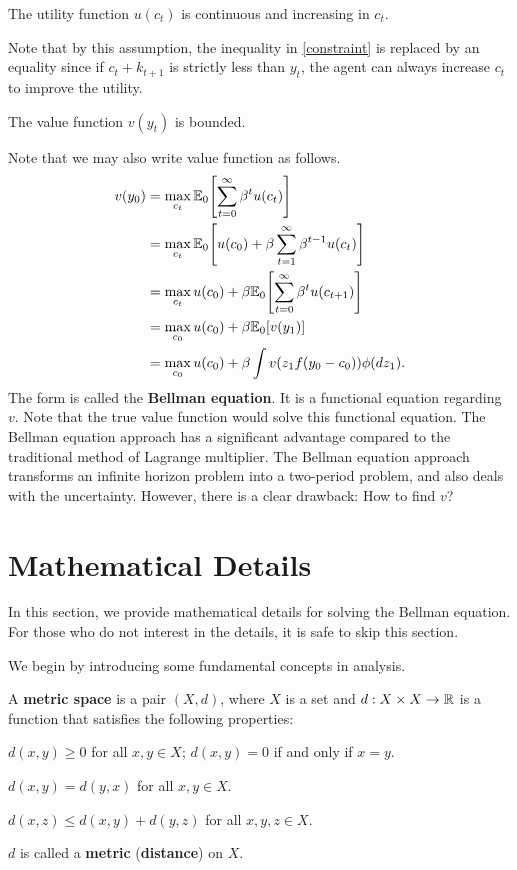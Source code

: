 \documentclass[12pt]{article}
\begin{document}
\begin{assumption}
    The utility function $u(c_t)$ is continuous and increasing in 
    $c_t$.
\end{assumption}

Note that by this assumption, the inequality in \eqref{constraint} 
is replaced by an equality since if $c_t + k_{t+1}$ is strictly less 
than $y_t$, the agent can always increase $c_t$ to improve the 
utility. 

\begin{assumption}
    The value function $v(y_t)$ is bounded.
\end{assumption}

Note that we may also write value function as follows. 
\begin{equation}
    \begin{split}
        v(y_0) 
        &= \max_{c_t} \E_0\sbrc{\sum_{t=0}^{\infty} \beta^t u(c_t)}\\
        &= \max_{c_t} \E_0\sbrc{u(c_0) + \beta\sum_{t=1}^{\infty} \beta^{t-1} u(c_t)}\\
        &= \max_{c_t} u(c_0) + \beta\E_0\sbrc{\sum_{t=0}^{\infty} \beta^{t} u(c_{t+1})}\\ 
        &= \max_{c_0} u(c_0) + \beta\E_0\sbrc{v(y_1)}\\
        &= \max_{c_0} u(c_0) + \beta\int v(z_1f(y_0-c_0))\phi(dz_1).
    \end{split}
\end{equation}
The form is called the \textbf{Bellman equation}. It is a functional 
equation regarding $v$. Note that the true value function would solve 
this functional equation. The Bellman equation approach 
has a significant advantage compared to the traditional method of 
Lagrange multiplier. The Bellman equation approach transforms an 
infinite horizon problem into a two-period problem, and also deals 
with the uncertainty. However, there is a clear drawback: How to find 
$v$? 

\section{Mathematical Details} 
In this section, we provide mathematical details for solving the 
Bellman equation. For those who do not interest in the details, it 
is safe to skip this section.

We begin by introducing some fundamental concepts in analysis. 

\begin{definition}
    A \textbf{metric space} is a pair $(X, d)$, where $X$ is a set 
    and $d: X \times X \to \mathbb{R}$ is a function that satisfies the 
    following properties: 
    \begin{thmenum}
        \item $d(x, y) \geq 0$ for all $x, y \in X$; $d(x, y) = 0$ 
        if and only if $x = y$.
        \item $d(x, y) = d(y, x)$ for all $x, y \in X$.
        \item $d(x, z) \leq d(x, y) + d(y, z)$ for all $x, y, z \in X$.
    \end{thmenum}
    $d$ is called a \textbf{metric} (\textbf{distance}) on $X$.
\end{definition}
\end{document}
